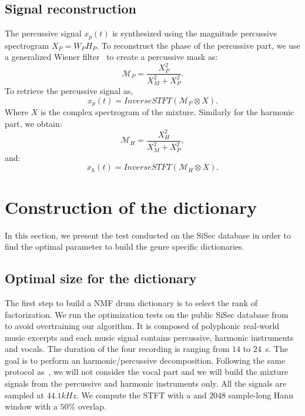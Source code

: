 \documentclass{article}
\begin{document}
 
\subsection{Signal reconstruction}

The percussive signal $x_p(t)$ is synthesized using the magnitude percussive spectrogram $X_P = W_PH_P$. To reconstruct the phase of the percussive part, we use a generalized Wiener filter~\cite{liutkus2015generalized} to create a percussive mask as:
\begin{equation}
\mathcal{M}_P = \frac{X_P^2}{X_M^2 + X_P^2}.
\end{equation} 
To retrieve the percussive signal as, 
\begin{equation}
x_p(t) = InverseSTFT(\mathcal{M}_P \otimes X).
\end{equation}
Where $X$ is the complex spectrogram of the mixture.
Similarly for the harmonic part, we obtain:
\begin{equation}\label{percuweiner}
\mathcal{M}_H = \frac{X_H^2}{X_M^2 + X_P^2},
\end{equation}
and:
\begin{equation}
x_h(t) = InverseSTFT(\mathcal{M}_H \otimes X).
\end{equation}




\section{Construction of the dictionary}

In this section, we present the test conducted on the SiSec database in order to find the optimal parameter to build the genre specific dictionaries. 

\subsection{Optimal size for the dictionary}\label{optimalsize}

The first step to build a NMF drum dictionary is to select the rank of factorization. We run the optimization tests on the public SiSec database from~\cite{SiSec10} to avoid overtraining our algorithm. It is composed of polyphonic real-world music excerpts and each music signal contains percussive, harmonic instruments and vocals. The duration of the four recording is ranging from $14$ to $24$~s. The goal is to perform an harmonic/percussive decomposition. Following the same protocol as~\cite{canadas2014percussive}, we will not consider the vocal part and we will build the mixture signals from the percussive and harmonic instruments only. All the signals are sampled at $44.1kHz$. We compute the STFT with a and $2048$ sample-long Hann window with a $50\%$ overlap.
\end{document}
